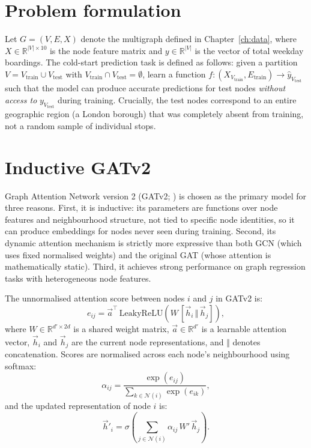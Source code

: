 \documentclass[12pt,a4paper]{report}
\begin{document}
\section{Problem formulation}
Let $G = (V, E, X)$ denote the multigraph defined in Chapter~\ref{ch:data},
where $X \in \mathbb{R}^{|V| \times 10}$ is the node feature matrix and
$y \in \mathbb{R}^{|V|}$ is the vector of total weekday boardings. The
cold-start prediction task is defined as follows: given a partition
$V = V_{\text{train}} \cup V_{\text{test}}$ with $V_{\text{train}} \cap V_{\text{test}} = \emptyset$,
learn a function $f: (X_{V_{\text{train}}}, E_{\text{train}}) \rightarrow \hat{y}_{V_{\text{test}}}$
such that the model can produce accurate predictions for test nodes
\emph{without access to} $y_{V_{\text{test}}}$ during training.
Crucially, the test nodes correspond to an entire geographic region
(a London borough) that was completely absent from training, not a random
sample of individual stops.

\section{Inductive GATv2}
\label{sec:gatv2}
Graph Attention Network version 2 (GATv2; \citealt{brody2022how}) is chosen
as the primary model for three reasons. First, it is inductive: its parameters
are functions over node features and neighbourhood structure, not tied to
specific node identities, so it can produce embeddings for nodes never seen
during training. Second, its dynamic attention mechanism is strictly more
expressive than both GCN (which uses fixed normalised weights) and the
original GAT (whose attention is mathematically static). Third, it achieves
strong performance on graph regression tasks with heterogeneous node features.

The unnormalised attention score between nodes $i$ and $j$ in GATv2 is:
\begin{equation}
  e_{ij} = \vec{a}^{\top}\,\mathrm{LeakyReLU}\!\left(W\,[\vec{h}_i \,\Vert\, \vec{h}_j]\right),
  \label{eq:gatv2attn}
\end{equation}
where $W \in \mathbb{R}^{d' \times 2d}$ is a shared weight matrix,
$\vec{a} \in \mathbb{R}^{d'}$ is a learnable attention vector,
$\vec{h}_i$ and $\vec{h}_j$ are the current node representations, and
$\Vert$ denotes concatenation. Scores are normalised across each node's
neighbourhood using softmax:
\begin{equation}
  \alpha_{ij} = \frac{\exp(e_{ij})}{\sum_{k \in \mathcal{N}(i)} \exp(e_{ik})},
\end{equation}
and the updated representation of node $i$ is:
\begin{equation}
  \vec{h}'_i = \sigma\!\left(\sum_{j \in \mathcal{N}(i)} \alpha_{ij}\,W'\,\vec{h}_j\right).
\end{equation}
\end{document}
